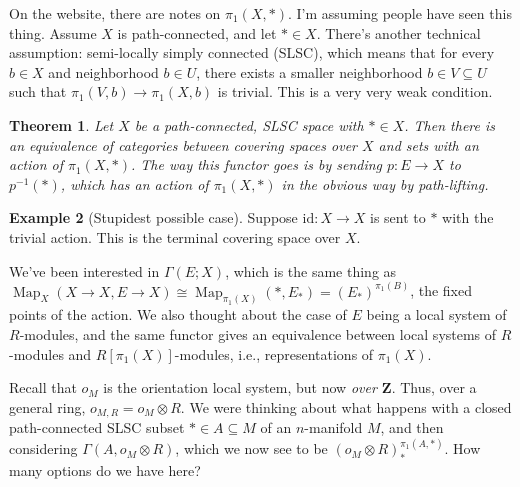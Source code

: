 \documentclass{amsart}
\theoremstyle{theorem}
\newtheorem{theorem}{Theorem}[section]
\theoremstyle{definition}
\newtheorem{example}[theorem]{Example}
\DeclareMathOperator{\Map}{Map}
\newcommand{\Z}{\mathbf Z}
\begin{document}
On the website, there are notes on $\pi_1(X,\ast)$. I'm assuming people have seen this thing. Assume $X$ is path-connected, and let $\ast\in X$. There's another technical assumption: semi-locally simply connected (SLSC), which means that for every $b\in X$ and neighborhood $b\in U$, there exists a smaller neighborhood $b\in V\subseteq U$ such that $\pi_1(V,b)\to\pi_1(X,b)$ is trivial. This is a very very weak condition.
\begin{theorem}
Let $X$ be a path-connected, SLSC space with $\ast\in X$. Then there is an equivalence of categories between covering spaces over $X$ and sets with an action of $\pi_1(X,\ast)$. The way this functor goes is by sending $p:E\to X$ to $p^{-1}(\ast)$, which has an action of $\pi_1(X,\ast)$ in the obvious way by path-lifting.
\end{theorem}
\begin{example}[Stupidest possible case]
Suppose $\mathrm{id}:X\to X$ is sent to $\ast$ with the trivial action. This is the terminal covering space over $X$.
\end{example}
We've been interested in $\Gamma(E;X)$, which is the same thing as $\Map_X(X\to X,E\to X)\cong\Map_{\pi_1(X)}(\ast,E_\ast)=(E_\ast)^{\pi_1(B)}$, the fixed points of the action. We also thought about the case of $E$ being a local system of $R$-modules, and the same functor gives an equivalence between local systems of $R$-modules and $R[\pi_1(X)]$-modules, i.e., representations of $\pi_1(X)$.

Recall that $o_M$ is the orientation local system, but now \emph{over $\Z$}. Thus, over a general ring, $o_{M,R}=o_M\otimes R$. We were thinking about what happens with a closed path-connected SLSC subset $\ast\in A\subseteq M$ of an $n$-manifold $M$, and then considering $\Gamma(A,o_M\otimes R)$, which we now see to be $(o_M\otimes R)_{\ast}^{\pi_1(A,\ast)}$. How many options do we have here?
\end{document}

